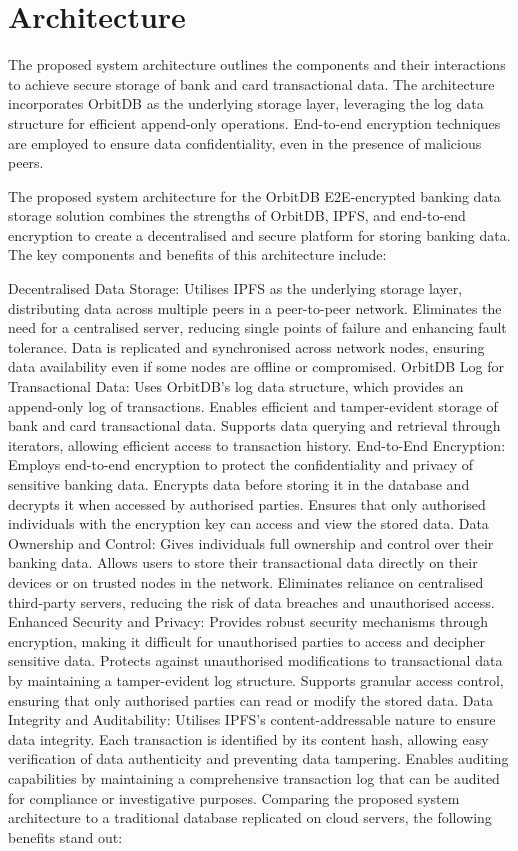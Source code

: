 \documentclass[a4paper,11 pt]{article}
\theoremstyle{definition}
\begin{document}
\section{Architecture}
The proposed system architecture outlines the components and their interactions to achieve secure storage of bank and card transactional data. The architecture incorporates OrbitDB as the underlying storage layer, leveraging the log data structure for efficient append-only operations. End-to-end encryption techniques are employed to ensure data confidentiality, even in the presence of malicious peers.

The proposed system architecture for the OrbitDB E2E-encrypted banking data storage solution combines the strengths of OrbitDB, IPFS, and end-to-end encryption to create a decentralised and secure platform for storing banking data. The key components and benefits of this architecture include:

Decentralised Data Storage:
Utilises IPFS as the underlying storage layer, distributing data across multiple peers in a peer-to-peer network.
Eliminates the need for a centralised server, reducing single points of failure and enhancing fault tolerance.
Data is replicated and synchronised across network nodes, ensuring data availability even if some nodes are offline or compromised.
OrbitDB Log for Transactional Data:
Uses OrbitDB's log data structure, which provides an append-only log of transactions.
Enables efficient and tamper-evident storage of bank and card transactional data.
Supports data querying and retrieval through iterators, allowing efficient access to transaction history.
End-to-End Encryption:
Employs end-to-end encryption to protect the confidentiality and privacy of sensitive banking data.
Encrypts data before storing it in the database and decrypts it when accessed by authorised parties.
Ensures that only authorised individuals with the encryption key can access and view the stored data.
Data Ownership and Control:
Gives individuals full ownership and control over their banking data.
Allows users to store their transactional data directly on their devices or on trusted nodes in the network.
Eliminates reliance on centralised third-party servers, reducing the risk of data breaches and unauthorised access.
Enhanced Security and Privacy:
Provides robust security mechanisms through encryption, making it difficult for unauthorised parties to access and decipher sensitive data.
Protects against unauthorised modifications to transactional data by maintaining a tamper-evident log structure.
Supports granular access control, ensuring that only authorised parties can read or modify the stored data.
Data Integrity and Auditability:
Utilises IPFS's content-addressable nature to ensure data integrity.
Each transaction is identified by its content hash, allowing easy verification of data authenticity and preventing data tampering.
Enables auditing capabilities by maintaining a comprehensive transaction log that can be audited for compliance or investigative purposes.
Comparing the proposed system architecture to a traditional database replicated on cloud servers, the following benefits stand out:
\end{document}
